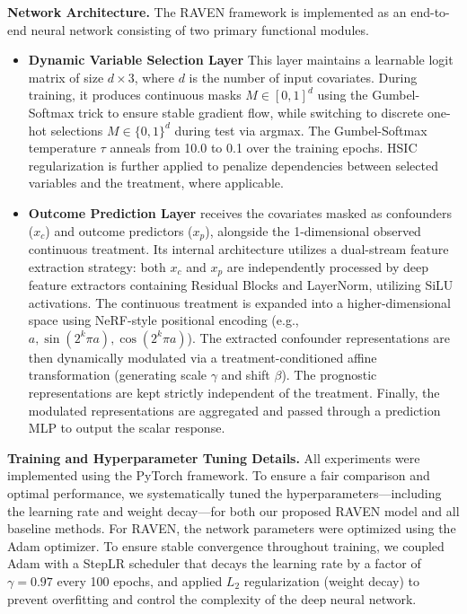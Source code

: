 \documentclass[twoside]{article}
\theoremstyle{plain}
\theoremstyle{definition}
\theoremstyle{remark}
\newtheorem{proof sketch}[theorem]{Proof Sketch}
\begin{document}
\textbf{Network Architecture.} The RAVEN framework is implemented as an end-to-end neural network consisting of two primary functional modules.

\begin{itemize}
    \item \textbf{Dynamic Variable Selection Layer}  This layer maintains a learnable logit matrix of size $d \times 3$, where $d$ is the number of input covariates. During training, it produces continuous masks $M \in [0, 1]^d$ using the Gumbel-Softmax trick to ensure stable gradient flow, while switching to discrete one-hot selections $M \in \{0, 1\}^d$ during test via argmax. The Gumbel-Softmax temperature $\tau$ anneals from 10.0 to 0.1 over the training epochs. HSIC regularization is further applied to penalize dependencies between selected variables and the treatment, where applicable.
    
    \item \textbf{Outcome Prediction Layer} receives the covariates masked as confounders ($x_c$) and outcome predictors ($x_p$), alongside the 1-dimensional observed continuous treatment. Its internal architecture utilizes a dual-stream feature extraction strategy: both $x_c$ and $x_p$ are independently processed by deep feature extractors containing Residual Blocks and LayerNorm, utilizing SiLU activations. The continuous treatment is expanded into a higher-dimensional space using NeRF-style positional encoding (e.g., $a, \sin(2^k \pi a), \cos(2^k \pi a)$). The extracted confounder representations are then dynamically modulated via a treatment-conditioned affine transformation (generating scale $\gamma$ and shift $\beta$). The prognostic representations are kept strictly independent of the treatment. Finally, the modulated representations are aggregated and passed through a prediction MLP to output the scalar response.
\end{itemize}

\textbf{Training and Hyperparameter Tuning Details.} 
All experiments were implemented using the PyTorch framework. To ensure a fair comparison and optimal performance, we systematically tuned the hyperparameters---including the learning rate and weight decay---for both our proposed RAVEN model and all baseline methods. For RAVEN, the network parameters were optimized using the Adam optimizer. To ensure stable convergence throughout training, we coupled Adam with a StepLR scheduler that decays the learning rate by a factor of $\gamma=0.97$ every 100 epochs, and applied $L_2$ regularization (weight decay) to prevent overfitting and control the complexity of the deep neural network.
\end{document}
